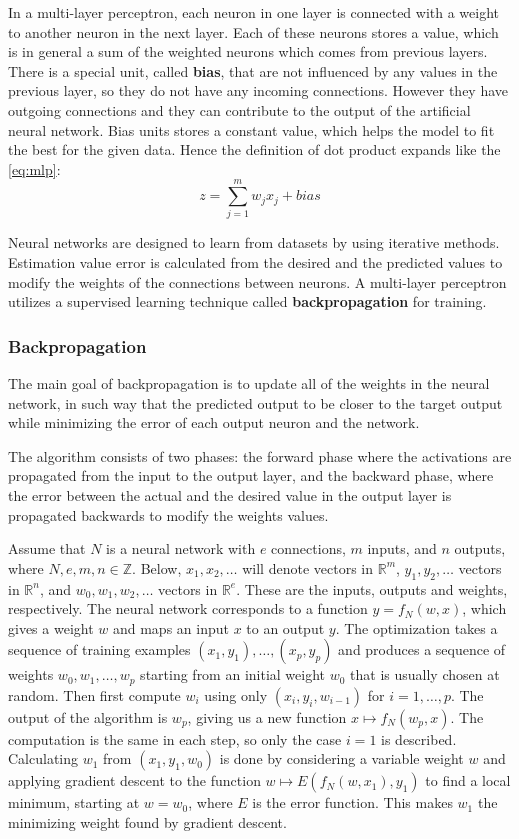 In a multi-layer perceptron, each neuron in one layer is connected with a weight to another neuron in the next layer. Each of these neurons stores a value, which is in general a sum of the weighted neurons which comes from previous layers. There is a special unit, called \textbf{bias}, that are not influenced by any values in the previous layer, so they do not have any incoming connections. However they have outgoing connections and they can contribute to the output of the artificial neural network. Bias units stores a constant value, which helps the model to fit the best for the given data. Hence the definition of dot product expands like the \autoref{eq:mlp}:
\begin{equation} z = \sum_{j=1}^m w_j x_j + bias \label{eq:mlp} \end{equation}

Neural networks are designed to learn from datasets by using iterative methods. Estimation value error is calculated from the desired and the predicted values to modify the weights of the connections between neurons. A multi-layer perceptron utilizes a supervised learning technique called \textbf{backpropagation} for training.


\subsubsection{Backpropagation}

The main goal of backpropagation \cite{chauvin2013backpropagation} is to update all of the weights in the neural network, in such way that the predicted output to be closer to the target output while minimizing the error of each output neuron and the network.

The algorithm consists of two phases: the forward phase where the activations are propagated from the input to the output layer, and the backward phase, where the error between the actual and the desired value in the output layer is propagated backwards to modify the weights values. \medskip

Assume that $N$ is a neural network with $e$ connections, $m$ inputs, and $n$ outputs, where $N,e,m,n\in\mathbb{Z}$. Below, $x_{1},x_{2},\dots$ will denote vectors in $\mathbb{R}^m$, $y_1,y_2,\dots$ vectors in $\mathbb{R}^n$, and $w_0,w_1,w_2,\dots$ vectors in $\mathbb{R}^e$. These are the inputs, outputs and weights, respectively. The neural network corresponds to a function $y=f_N(w,x)$, which gives a weight $w$ and maps an input $x$ to an output $y$. The optimization takes a sequence of training examples $(x_1,y_1),\dots ,(x_p,y_p)$ and produces a sequence of weights $w_0,w_1,\dots ,w_p$ starting from an initial weight $w_0$ that is usually chosen at random. Then first compute $w_i$ using only $(x_i,y_i,w_{i-1})$ for $i=1,\dots ,p$. The output of the algorithm is $w_p$, giving us a new function $x \mapsto f_N(w_p,x)$. The computation is the same in each step, so only the case $i=1$ is described. Calculating $w_1$ from $(x_1,y_1,w_0)$ is done by considering a variable weight $w$ and applying gradient descent to the function $w \mapsto E(f_N(w,x_1),y_1)$ to find a local minimum, starting at $w=w_0$, where $E$ is the error function. This makes $w_1$ the minimizing weight found by gradient descent.\medskip

